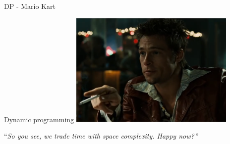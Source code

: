 \documentclass{beamer}
\begin{document}
%

\begin{frame}{DP - Mario Kart} %
	
\end{frame}

%

\begin{frame}{Dynamic programming}
	\centering
	\includegraphics[width=0.6\textwidth]{tyler2.png}

	\bigskip
	``\emph{So you see, we trade time with space complexity. Happy now?}\,''
\end{frame}
\end{document}
